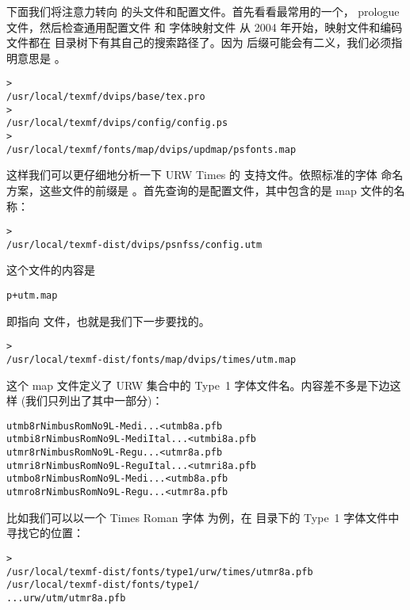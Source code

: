 \documentclass{article}
\begin{document}
下面我们将注意力转向  的头文件和配置文件。首先看看最常用的一个，
prologue 文件，然后检查通用配置文件  和 \PS{} 字体映射文件
\Dash 从 2004 年开始，映射文件和编码文件都在 
目录树下有其自己的搜索路径了。因为  后缀可能会有二义，我们必须指明意思是
。

\begin{alltt}
> 
   /usr/local/texmf/dvips/base/tex.pro
> 
   /usr/local/texmf/dvips/config/config.ps
> 
   /usr/local/texmf/fonts/map/dvips/updmap/psfonts.map
\end{alltt}

这样我们可以更仔细地分析一下 URW Times 的 \PS{} 支持文件。依照标准的字体
命名方案，这些文件的前缀是 。首先查询的是配置文件，其中包含的是 map
文件的名称：

\begin{alltt}
> 
   /usr/local/texmf-dist/dvips/psnfss/config.utm
\end{alltt}

这个文件的内容是

\begin{alltt}
  p +utm.map
\end{alltt}

即指向  文件，也就是我们下一步要找的。

\begin{alltt}
> 
   /usr/local/texmf-dist/fonts/map/dvips/times/utm.map
\end{alltt}

这个 map 文件定义了 URW 集合中的 Type~1 \PS{} 字体文件名。内容差不多是下边这样
(我们只列出了其中一部分)：

\begin{alltt}
utmb8r  NimbusRomNo9L-Medi    ... <utmb8a.pfb
utmbi8r NimbusRomNo9L-MediItal... <utmbi8a.pfb
utmr8r  NimbusRomNo9L-Regu    ... <utmr8a.pfb
utmri8r NimbusRomNo9L-ReguItal... <utmri8a.pfb
utmbo8r NimbusRomNo9L-Medi    ... <utmb8a.pfb
utmro8r NimbusRomNo9L-Regu    ... <utmr8a.pfb
\end{alltt}

比如我们可以以一个 Times Roman 字体  为例，在 
目录下的 Type~1 字体文件中寻找它的位置：

\begin{alltt}
> 
\ifSingleColumn   /usr/local/texmf-dist/fonts/type1/urw/times/utmr8a.pfb
\else   /usr/local/texmf-dist/fonts/type1/
... urw/utm/utmr8a.pfb
\fi\end{alltt}
\end{document}
